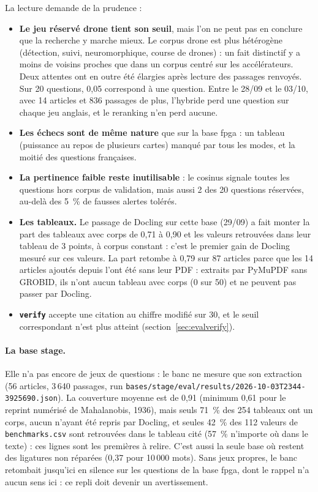 \documentclass[11pt,a4paper]{article}
\newcommand{\cmd}[1]{\texttt{#1}}
\begin{document}
La lecture demande de la prudence :
\begin{itemize}
  \item \textbf{Le jeu réservé drone tient son seuil}, mais l'on ne peut pas en conclure que
    la recherche y marche mieux. Le corpus drone est plus hétérogène (détection, suivi,
    neuromorphique, course de drones) : un fait distinctif y a moins de voisins proches que
    dans un corpus centré sur les accélérateurs. Deux attentes ont en outre été élargies
    après lecture des passages renvoyés. Sur 20 questions, 0,05 correspond à une question.
    Entre le 28/09 et le 03/10, avec 14 articles et 836 passages de plus, l'hybride perd une
    question sur chaque jeu anglais, et le reranking n'en perd aucune.
  \item \textbf{Les échecs sont de même nature} que sur la base fpga : un tableau (puissance
    au repos de plusieurs cartes) manqué par tous les modes, et la moitié des questions
    françaises.
  \item \textbf{La pertinence faible reste inutilisable} : le cosinus signale toutes les
    questions hors corpus de validation, mais aussi 2 des 20 questions réservées, au-delà des
    5~\% de fausses alertes tolérés.
  \item \textbf{Les tableaux.} Le passage de Docling sur cette base (29/09) a fait monter la
    part des tableaux avec corps de 0,71 à 0,90 et les valeurs retrouvées dans leur tableau
    de 3 points, à corpus constant : c'est le premier gain de Docling mesuré sur ces valeurs.
    La part retombe à 0,79 sur 87 articles parce que les 14 articles ajoutés depuis l'ont été
    sans leur PDF : extraits par PyMuPDF sans GROBID, ils n'ont aucun tableau avec corps
    (0 sur 50) et ne peuvent pas passer par Docling.
  \item \textbf{\cmd{verify}} accepte une citation au chiffre modifié sur 30, et le seuil
    correspondant n'est plus atteint (section~\ref{sec:evalverify}).
\end{itemize}

\paragraph{La base stage.} Elle n'a pas encore de jeux de questions : le banc ne mesure que
son extraction (56 articles, 3\,640 passages, run \cmd{bases/stage/eval/results/2026-10-03T2344-3925690.json}).
La couverture moyenne est de 0,91 (minimum 0,61 pour le reprint numérisé de Mahalanobis,
1936), mais seuls 71~\% des 254 tableaux ont un corps, aucun n'ayant été repris par Docling,
et seules 42~\% des 112 valeurs de \cmd{benchmarks.csv} sont retrouvées dans le tableau cité
(57~\% n'importe où dans le texte) : ces lignes sont les premières à relire. C'est
aussi la seule base où restent des ligatures non réparées (0,37 pour 10\,000 mots).
Sans jeux propres, le banc retombait jusqu'ici en silence sur les questions de la base fpga,
dont le rappel n'a aucun sens ici : ce repli doit devenir un avertissement.
\end{document}
